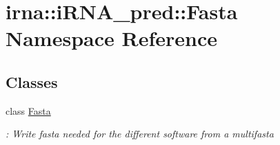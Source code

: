 \hypertarget{namespaceirna_1_1iRNA__pred_1_1Fasta}{
\section{irna\-:\-:i\-R\-N\-A\-\_\-pred\-:\-:\-Fasta \-Namespace \-Reference}
\label{namespaceirna_1_1iRNA__pred_1_1Fasta}
}
\subsection*{\-Classes}
\begin{DoxyCompactItemize}
\item 
class \hyperlink{classirna_1_1iRNA__pred_1_1Fasta_1_1Fasta}{\-Fasta}
\begin{DoxyCompactList}\small\item\em \-: \-Write fasta needed for the different software from a multifasta \end{DoxyCompactList}\end{DoxyCompactItemize}
